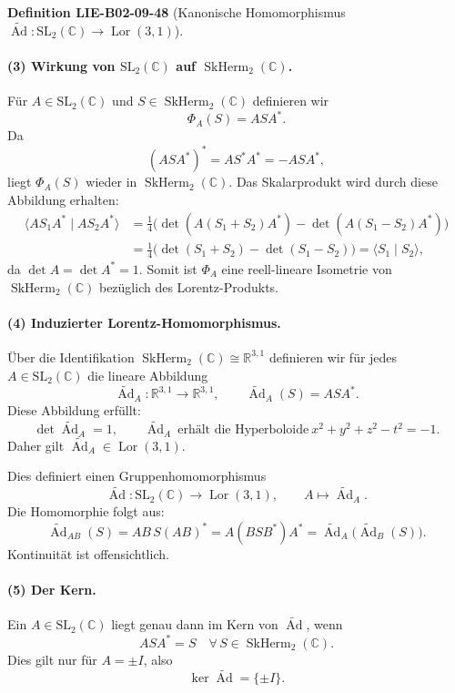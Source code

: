 \documentclass[10pt, letterpaper]{article}
\newcommand{\CustomHeading}[3]{%
  \par\medskip\noindent%
  \textbf{#1 #2} \textnormal{(#3)}.\enskip%
}
\newenvironment{DEF}[2]{\begin{unitbox}\CustomHeading{Definition}{#1}{#2}}{\end{unitbox}}
\begin{document}
\begin{DEF}{LIE-B02-09-48}{Kanonische Homomorphismus \(\widetilde{\operatorname{Ad}}:\mathrm{SL}_2(\mathbb{C})\to \operatorname{Lor}(3,1)\)}
\paragraph{(3) Wirkung von \(\mathrm{SL}_2(\mathbb{C})\) auf \(\operatorname{SkHerm}_2(\mathbb{C})\).}
Für \(A\in \mathrm{SL}_2(\mathbb{C})\) und \(S\in \operatorname{SkHerm}_2(\mathbb{C})\) definieren wir
\[
\Phi_A(S)=A S A^*.
\]
Da
\[
(ASA^*)^*=A S^* A^*=-A S A^*,
\]
liegt \(\Phi_A(S)\) wieder in \(\operatorname{SkHerm}_2(\mathbb{C})\).
Das Skalarprodukt wird durch diese Abbildung erhalten:
\[
\begin{aligned}
\langle A S_1 A^*\mid A S_2 A^*\rangle
&=\tfrac{1}{4}\bigl(\det(A(S_1+S_2)A^*)-\det(A(S_1-S_2)A^*)\bigr)\\
&=\tfrac{1}{4}\bigl(\det(S_1+S_2)-\det(S_1-S_2)\bigr)
=\langle S_1\mid S_2\rangle,
\end{aligned}
\]
da \(\det A=\det A^*=1\).
Somit ist \(\Phi_A\) eine reell-lineare Isometrie von
\(\operatorname{SkHerm}_2(\mathbb{C})\) bezüglich des Lorentz-Produkts.

\paragraph{(4) Induzierter Lorentz-Homomorphismus.}
Über die Identifikation \(\operatorname{SkHerm}_2(\mathbb{C})\cong \mathbb{R}^{3,1}\)
definieren wir für jedes \(A\in\mathrm{SL}_2(\mathbb{C})\) die lineare Abbildung
\[
\widetilde{\operatorname{Ad}}_A:\mathbb{R}^{3,1}\to\mathbb{R}^{3,1},
\qquad
\widetilde{\operatorname{Ad}}_A(S)=A S A^*.
\]
Diese Abbildung erfüllt:
\[
\det\widetilde{\operatorname{Ad}}_A=1,
\qquad
\widetilde{\operatorname{Ad}}_A\ \text{erhält die Hyperboloide}\ 
x^2+y^2+z^2-t^2=-1.
\]
Daher gilt \(\widetilde{\operatorname{Ad}}_A\in \operatorname{Lor}(3,1)\).

Dies definiert einen Gruppenhomomorphismus
\[
\boxed{
\widetilde{\operatorname{Ad}}:\mathrm{SL}_2(\mathbb{C})
\longrightarrow \operatorname{Lor}(3,1),
\qquad
A\mapsto \widetilde{\operatorname{Ad}}_A.
}
\]
Die Homomorphie folgt aus:
\[
\widetilde{\operatorname{Ad}}_{AB}(S)
=AB\,S(AB)^*
=A(BSB^*)A^*
=\widetilde{\operatorname{Ad}}_A\bigl(\widetilde{\operatorname{Ad}}_B(S)\bigr).
\]
Kontinuität ist offensichtlich.

\paragraph{(5) Der Kern.}
Ein \(A\in\mathrm{SL}_2(\mathbb{C})\) liegt genau dann im Kern von \(\widetilde{\operatorname{Ad}}\),
wenn
\[
A S A^*=S
\quad\forall\, S\in \operatorname{SkHerm}_2(\mathbb{C}).
\]
Dies gilt nur für \(A=\pm I\), also
\[
\ker\widetilde{\operatorname{Ad}}=\{\pm I\}.
\]


\end{DEF}
\end{document}
